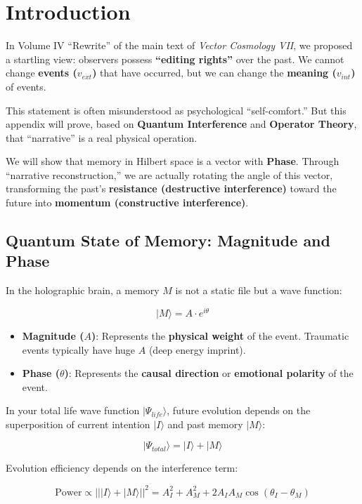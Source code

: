 \section{Introduction}

In Volume IV ``Rewrite'' of the main text of \textit{Vector Cosmology VII}, we proposed a startling view: observers possess \textbf{``editing rights''} over the past. We cannot change \textbf{events ($v_{ext}$)} that have occurred, but we can change the \textbf{meaning ($v_{int}$)} of events.

This statement is often misunderstood as psychological ``self-comfort.'' But this appendix will prove, based on \textbf{Quantum Interference} and \textbf{Operator Theory}, that ``narrative'' is a real physical operation.

We will show that memory in Hilbert space is a vector with \textbf{Phase}. Through ``narrative reconstruction,'' we are actually rotating the angle of this vector, transforming the past's \textbf{resistance (destructive interference)} toward the future into \textbf{momentum (constructive interference)}.

\subsection{Quantum State of Memory: Magnitude and Phase}

In the holographic brain, a memory $M$ is not a static file but a wave function:

\[|M\rangle = A \cdot e^{i\theta}\]

\begin{itemize}
\item \textbf{Magnitude ($A$)}: Represents the \textbf{physical weight} of the event. Traumatic events typically have huge $A$ (deep energy imprint).

\item \textbf{Phase ($\theta$)}: Represents the \textbf{causal direction} or \textbf{emotional polarity} of the event.
\end{itemize}

In your total life wave function $|\Psi_{life}\rangle$, future evolution depends on the superposition of current intention $|I\rangle$ and past memory $|M\rangle$:

\[|\Psi_{total}\rangle = |I\rangle + |M\rangle\]

Evolution efficiency depends on the interference term:

\[\text{Power} \propto || |I\rangle + |M\rangle ||^2 = A_I^2 + A_M^2 + 2 A_I A_M \cos(\theta_I - \theta_M)\]

